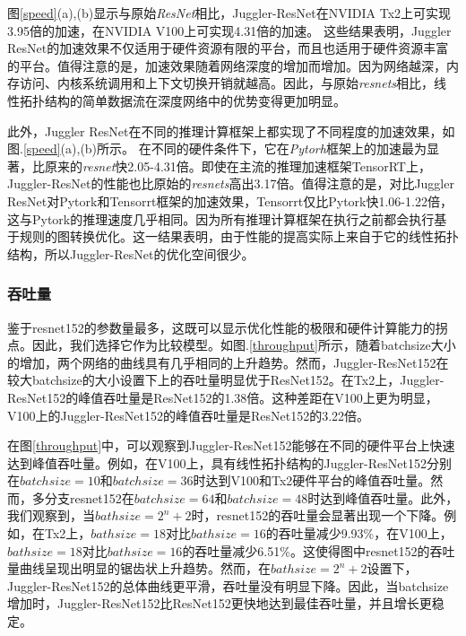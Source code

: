 图\ref{speed}(a),(b)显示与原始\emph{ResNet}相比，Juggler-ResNet在NVIDIA Tx2上可实现3.95倍的加速，在NVIDIA V100上可实现4.31倍的加速。 这些结果表明，Juggler ResNet的加速效果不仅适用于硬件资源有限的平台，而且也适用于硬件资源丰富的平台。值得注意的是，加速效果随着网络深度的增加而增加。因为网络越深，内存访问、内核系统调用和上下文切换开销就越高。因此，与原始\emph{resnets}相比，线性拓扑结构的简单数据流在深度网络中的优势变得更加明显。

此外，Juggler ResNet在不同的推理计算框架上都实现了不同程度的加速效果，如图.\ref{speed}(a),(b)所示。 在不同的硬件条件下，它在\emph{Pytorh}框架上的加速最为显著，比原来的\emph{resnet}快2.05-4.31倍。即使在主流的推理加速框架TensorRT上，Juggler-ResNet的性能也比原始的\emph{resnets}高出3.17倍。值得注意的是，对比Juggler ResNet对Pytork和Tensorrt框架的加速效果，Tensorrt仅比Pytork快1.06-1.22倍，这与Pytork的推理速度几乎相同。因为所有推理计算框架在执行之前都会执行基于规则的图转换优化。这一结果表明，由于性能的提高实际上来自于它的线性拓扑结构，所以Juggler-ResNet的优化空间很少。 

\subsubsection{吞吐量}

鉴于resnet152的参数量最多，这既可以显示优化性能的极限和硬件计算能力的拐点。因此，我们选择它作为比较模型。如图.\ref{throughput}所示，随着batchsize大小的增加，两个网络的曲线具有几乎相同的上升趋势。然而，Juggler-ResNet152在较大batchsize的大小设置下上的吞吐量明显优于ResNet152。在Tx2上，Juggler-ResNet152的峰值吞吐量是ResNet152的1.38倍。这种差距在V100上更为明显，V100上的Juggler-ResNet152的峰值吞吐量是ResNet152的3.22倍。

在图\ref{throughput}中，可以观察到Juggler-ResNet152能够在不同的硬件平台上快速达到峰值吞吐量。例如，在V100上，具有线性拓扑结构的Juggler-ResNet152分别在$batchsize=10$和$batchsize=36$时达到V100和Tx2硬件平台的峰值吞吐量。然而，多分支resnet152在$batchsize=64$和$batchsize=48$时达到峰值吞吐量。此外，我们观察到，当$bathsize=2^n+2$时，resnet152的吞吐量会显著出现一个下降。例如，在Tx2上，$bathsize=18$对比$bathsize=16$的吞吐量减少9.93\%，在V100上，$bathsize=18$对比$bathsize=16$的吞吐量减少6.51\%。这使得图中resnet152的吞吐量曲线呈现出明显的锯齿状上升趋势。然而，在$bathsize=2^n+2$设置下，Juggler-ResNet152的总体曲线更平滑，吞吐量没有明显下降。因此，当batchsize增加时，Juggler-ResNet152比ResNet152更快地达到最佳吞吐量，并且增长更稳定。

